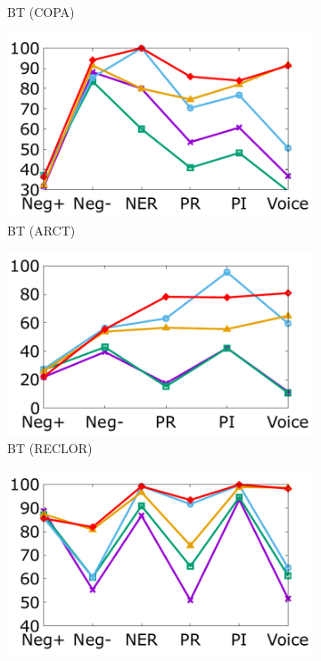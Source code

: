 \begin{figure}[th]
\begin{subfigure}[b]{0.162\textwidth}
\caption{BT (COPA)}
\label{fig:copa_bert}
\end{subfigure}
\hfill
\begin{subfigure}[b]{0.162\textwidth}
\centering
\includegraphics[width=\columnwidth]{data/arct_bert.pdf}
\caption{BT (ARCT)}
\label{fig:arct_bert}
\end{subfigure}
\hfill
\begin{subfigure}[b]{0.162\textwidth}
\centering
\includegraphics[width=\columnwidth]{data/reclor_bert.pdf}
\caption{BT (RECLOR)}
\label{fig:reclor_bert}
\end{subfigure}
\hfill
\begin{subfigure}[b]{0.162\textwidth}
\centering
\includegraphics[width=\columnwidth]{data/roc_xlnet.pdf}

\end{subfigure}
\end{figure}
